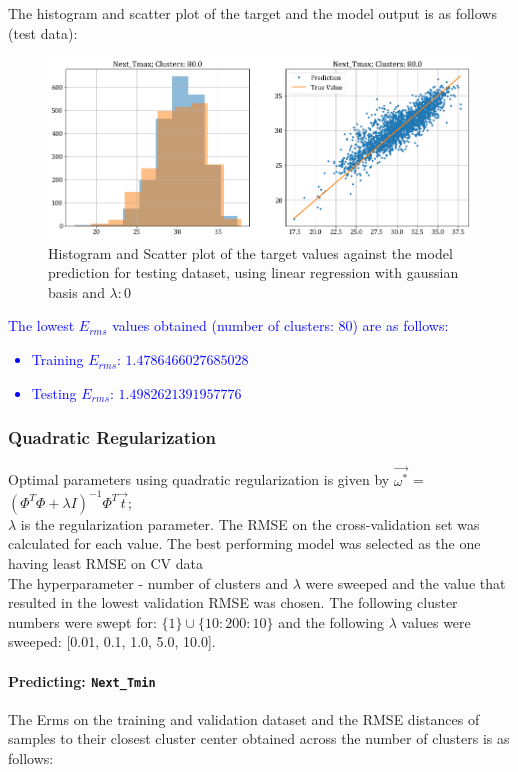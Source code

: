 \documentclass[12pt,a4paper]{article}
\newcommand{\noi}{\noindent}
\def\tt#1{\texttt{#1}}
\begin{document}
\noi
The histogram and scatter plot of the target and the model output is as follows (test data):
\begin{figure}[H]
    \centering
    \includegraphics[scale=0.49]{images/t3_d3/no_reg/T_max_test.png}
    \caption{Histogram and Scatter plot of the target values against the model prediction for testing dataset, using linear regression with gaussian basis and $\lambda: 0$}
\end{figure}

\noi
\textcolor{blue}{The lowest $E_{rms}$ values obtained (number of clusters: 80) are as follows:
\begin{itemize}
    \itemsep0em
    \item Training $E_{rms}$: $1.4786466027685028$
    \item Testing $E_{rms}$: $1.4982621391957776$
\end{itemize}
}

\subsubsection{Quadratic Regularization}
Optimal parameters using quadratic regularization is given by $\vec{\omega^*}$ = $(\Phi^T\Phi + \lambda I)^{-1} \Phi^T \vec{t}$;\\

\noi
$\lambda$ is the regularization parameter. The RMSE on the cross-validation set was calculated for each value. The best performing model was selected as the one having least RMSE on CV data \\

\noi
The hyperparameter - number of clusters and $\lambda$ were sweeped and the value that resulted in the lowest validation RMSE was chosen. The following cluster numbers were swept for: $\{1\} \cup \{10:200:10\}$ and the following $\lambda$ values were sweeped: [0.01, 0.1,  1.0, 5.0, 10.0].

\paragraph{Predicting: \tt{Next\_Tmin}}
The Erms on the training and validation dataset and the RMSE distances of samples to their closest cluster center obtained across the number of clusters is as follows:

\end{document}
